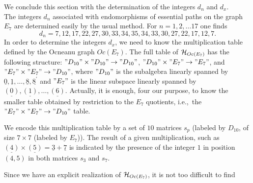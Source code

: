 \documentclass[a4paper,11pt]{article}
\def\ie{{\rm i.e.,\/}\ }
\newcommand{\ud}[1]{\underline{#1}}
\begin{document}
We conclude this section with the determination of the integers $d_{n}$ and
$d_{x}$.\\
The integers $d_{n}$ associated with endomorphisms of essential paths
on the graph $E_{7}$ are determined easily by the usual method.
For $n=1,2,\ldots 17$ one finds
$$
d_{n} = 7,12,17,22,27,30,33,34,35,34,33,30,27,22,17,12,7.
$$
In order to determine the integers $d_x$, we need to know the
multiplication table defined by the Ocneanu graph $Oc(E_7)$.
   The full table of ${\cal H}_{Oc(E_7)}$ has the
following structure: $"D_{10}" \times "D_{10}" \rightarrow "D_{10}"$,
$"D_{10}" \times "E_7" \rightarrow "E_7"$, and
$"E_7" \times "E_7" \rightarrow "D_{10}"$, where $"D_{10}"$ is the
subalgebra linearly spanned by $\ud{0}, \ud{1}, \ldots, \ud{8}, \ud{8^{'}}$ and
$"E_7"$ is the linear subspace  linearly spanned by $\ud{(0)},
\ud{(1)}, \ldots,
\ud{(6)}$. Actually, it is enough, four our purpose, to know the smaller table
obtained by restriction to the $E_7$ quotients, \ie the
$"E_7" \times "E_7" \rightarrow "D_{10}"$ table.

We encode this multiplication table by a set of $10$ matrices $s_p$
(labeled by
$D_{10}$, of size $7\times 7$ (labeled by $E_7$)).
The result of a given multiplication, such as
$\ud{(4)} \times \ud{(5)} = \ud{3} + \ud{7}$
is indicated by the presence of the integer $1$ in position $(4,5)$ in both
matrices $s_3$ and $s_7$.

Since we have an explicit realization of ${\cal H}_{Oc(E_7)}$, it is not too
difficult to find
\end{document}
